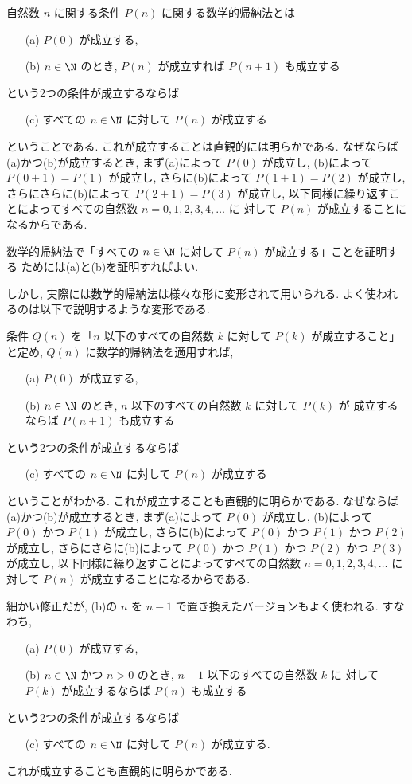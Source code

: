 \documentclass[12pt,twoside]{jarticle}
\begin{document}
自然数 $n$ に関する条件 $P(n)$ に関する数学的帰納法とは
\begin{itemize}
\item[(a)] $P(0)$ が成立する,
\item[(b)] $n\in\N$ のとき, $P(n)$ が成立すれば $P(n+1)$ も成立する
\end{itemize}
という2つの条件が成立するならば
\begin{itemize}
\item[(c)] すべての $n\in\N$ に対して $P(n)$ が成立する
\end{itemize}
ということである. これが成立することは直観的には明らかである.
なぜならば(a)かつ(b)が成立するとき, 
まず(a)によって $P(0)$ が成立し,
(b)によって $P(0+1)=P(1)$ が成立し, 
さらに(b)によって $P(1+1)=P(2)$ が成立し,
さらにさらに(b)によって $P(2+1)=P(3)$ が成立し,
以下同様に繰り返すことによってすべての自然数 $n=0,1,2,3,4,\ldots$ に
対して $P(n)$ が成立することになるからである.

数学的帰納法で「すべての $n\in\N$ に対して $P(n)$ が成立する」ことを証明する
ためには(a)と(b)を証明すればよい.

しかし, 実際には数学的帰納法は様々な形に変形されて用いられる.
よく使われるのは以下で説明するような変形である.

条件 $Q(n)$ を「$n$ 以下のすべての自然数 $k$ に対して $P(k)$ が成立すること」
と定め, $Q(n)$ に数学的帰納法を適用すれば,
\begin{itemize}
\item[(a)] $P(0)$ が成立する,
\item[(b)] $n\in\N$ のとき, $n$ 以下のすべての自然数 $k$ に対して $P(k)$ が
  成立するならば $P(n+1)$ も成立する
\end{itemize}
という2つの条件が成立するならば
\begin{itemize}
\item[(c)] すべての $n\in\N$ に対して $P(n)$ が成立する
\end{itemize}
ということがわかる.  これが成立することも直観的に明らかである.
なぜならば(a)かつ(b)が成立するとき, 
まず(a)によって $P(0)$ が成立し,
(b)によって $P(0)$ かつ $P(1)$ が成立し, 
さらに(b)によって $P(0)$ かつ $P(1)$ かつ $P(2)$ が成立し,
さらにさらに(b)によって $P(0)$ かつ $P(1)$ かつ $P(2)$ かつ $P(3)$ が成立し,
以下同様に繰り返すことによってすべての自然数 $n=0,1,2,3,4,\ldots$ に
対して $P(n)$ が成立することになるからである.

細かい修正だが, (b)の $n$ を $n-1$ で置き換えたバージョンもよく使われる.
すなわち, 
\begin{itemize}
\item[(a)] $P(0)$ が成立する,
\item[(b)] $n\in\N$ かつ $n>0$ のとき,  $n-1$ 以下のすべての自然数 $k$ に
  対して $P(k)$ が成立するならば $P(n)$ も成立する
\end{itemize}
という2つの条件が成立するならば
\begin{itemize}
\item[(c)] すべての $n\in\N$ に対して $P(n)$ が成立する.
\end{itemize}
これが成立することも直観的に明らかである.
\end{document}

